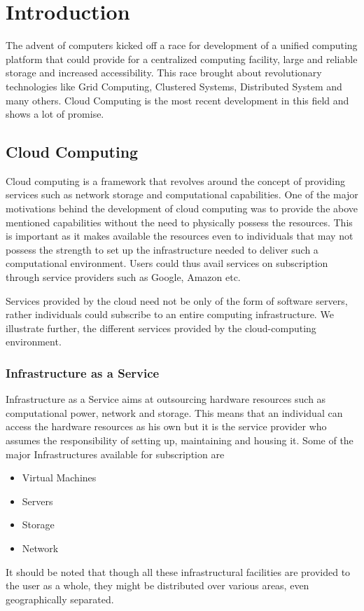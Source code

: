 
\chapter{Introduction}
The advent of computers kicked off a race for development of a unified computing platform that could provide for a centralized computing facility, large and reliable storage and increased accessibility. This race brought about revolutionary technologies like Grid Computing, Clustered Systems, Distributed System and many others. Cloud Computing is the most recent development in this field and shows a lot of promise.
\section{Cloud Computing}
Cloud computing is a framework that revolves around the concept of providing services such as network storage and computational capabilities. One of the major motivations behind the development of cloud computing was to provide the above mentioned capabilities without the need to physically possess the resources. This is important as it makes available the resources even to individuals that may not possess the strength to set up the infrastructure needed to deliver such a computational environment. Users could thus avail services on subscription through service providers such as Google, Amazon etc.

Services provided by the cloud need not be only of the form of software servers, rather individuals could subscribe to an entire computing infrastructure. We illustrate further, the different services provided by the cloud-computing environment.
\subsection{Infrastructure as a Service}
Infrastructure as a Service aims at outsourcing hardware resources such as computational power, network and storage. This means that an individual can access the hardware resources as his own but it is the service provider who assumes the responsibility of setting up, maintaining and housing it. Some of the major Infrastructures available for subscription are
	\begin{itemize}
		\item Virtual Machines
		\item Servers
		\item Storage
		\item Network
	\end{itemize}
It should be noted that though all these infrastructural facilities are provided to the user as a whole, they might be distributed over various areas, even geographically separated.

